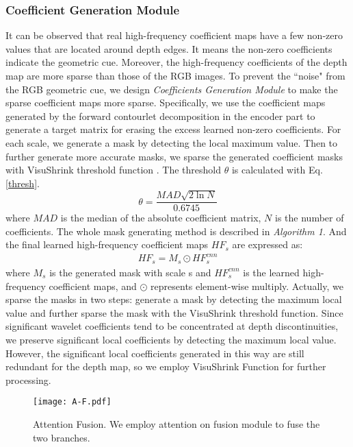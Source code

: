 \documentclass[10pt,times,mathptm,psfig,twocolumn,journals]{IEEEtran}
\begin{document}
\subsubsection{Coefficient Generation Module}
\label{CGM}
It can be observed that real high-frequency coefficient maps have a few non-zero values that are located around depth edges. It means the non-zero coefficients indicate the geometric cue. 
Moreover, the high-frequency coefficients of the depth map are more sparse than those of the RGB images. To prevent the ``noise" from the RGB geometric cue, we design \textit{Coefficients Generation Module} to make the sparse coefficient maps more sparse.
Specifically, we use the coefficient maps generated by the forward contourlet decomposition in the encoder part to generate a target matrix for erasing the excess learned non-zero coefficients. For each scale, we generate a mask by detecting the local maximum value. Then to further generate more accurate masks, we sparse the generated coefficient masks with VisuShrink threshold function \cite{zhao2016scanner}. The threshold $\theta$ is calculated with Eq. \ref{thresh}.
\begin{equation}
\label{thresh}
\theta = \frac{MAD\sqrt{2\ln{N}}}{0.6745} 
\end{equation}
where $MAD$ is the median of the absolute coefficient matrix, $N$ is the number of coefficients. The whole mask generating method is described in \textit{Algorithm 1}. And the final learned high-frequency coefficient maps $HF_{s}$ are expressed as:
\begin{eqnarray}
HF_{s} = M_{s}\odot HF_{s}^{cnn}
\end{eqnarray}
where $M_{s}$ is the generated mask with scale s and $HF_{s}^{cnn}$ is the learned high-frequency coefficient maps, and $\odot$ represents element-wise multiply. Actually, we sparse the masks in two steps: generate a mask by detecting the maximum local value and further sparse the mask with the VisuShrink threshold function. Since significant wavelet coefficients tend to be concentrated at depth discontinuities, we preserve significant local coefficients by detecting the maximum local value. However, the significant local coefficients generated in this way are still redundant for the depth map, so we employ VisuShrink Function for further processing.
\begin{figure}[t]
\centering
\texttt{[image: A-F.pdf]}
\caption{Attention Fusion. We employ attention on fusion module to fuse the two branches.}
\label{fig:AF}
\end{figure}
\end{document}
